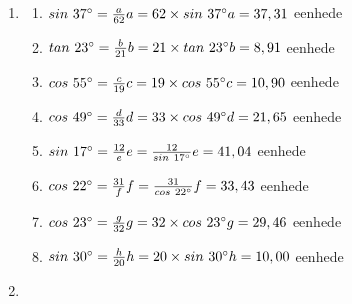  \begin{solutions}{}{
\begin{enumerate}[itemsep=5pt, label=\textbf{\arabic*}. ] 


\item 
\begin{multicols}{2}
      \begin{enumerate}[noitemsep, label=\textbf{(\alph*)} ]
      
\item $sin~37^{\circ} = \frac{a}{62}\\ a = 62 \times sin~ 37^{\circ} \\ a=37,31$ eenhede
\item $tan~23^{\circ} = \frac{b}{21}\\ b = 21 \times tan~23^{\circ} \\b=8,91$ eenhede
\item $cos~55^{\circ}  = \frac{c}{19}\\ c = 19 \times cos~55^{\circ} \\c=10,90$ eenhede
\item $cos~49^{\circ} =\frac{d}{33} \\ d = 33 \times cos~49^{\circ} \\d=21,65$ eenhede
\item $sin~17^{\circ} = \frac{12}{e}\\ e = \frac{12}{sin~17^{\circ} } \\e=41,04$ eenhede
\item $cos ~22^{\circ}  = \frac{31}{f}\\ f = \frac{31}{cos~22^{\circ} }\\f=33,43$ eenhede
\item $cos~ 23^{\circ}=\frac{g}{32}\\ g = 32 \times cos~23^{\circ} \\ g=29,46$ eenhede
\item $sin~30^{\circ}  = \frac{h}{20}\\ h = 20 \times sin~30^{\circ} \\h=10,00$ eenhede
      \end{enumerate}
\end{multicols}
\item 


\end{enumerate}}
\end{solutions}
